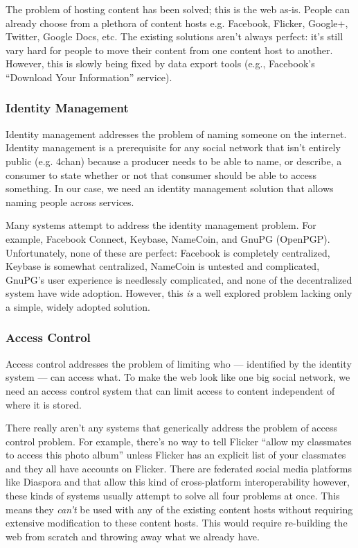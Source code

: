\documentclass[pdftex,12pt,a4papaer,twoside,notitlepage]{report}
\begin{document}
The problem of hosting content has been solved; this is the web as-is. People
can already choose from a plethora of content hosts e.g. Facebook, Flicker,
Google+, Twitter, Google Docs, etc. The existing solutions aren't always
perfect: it's still vary hard for people to move their content from one content
host to another. However, this is slowly being fixed by data export tools (e.g.,
Facebook's ``Download Your Information'' service).

\subsubsection{Identity Management}

Identity management addresses the problem of naming someone on the internet.
Identity management is a prerequisite for any social network that isn't entirely
public (e.g. 4chan) because a producer needs to be able to name, or describe, a
consumer to state whether or not that consumer should be able to access
something. In our case, we need an identity management solution that allows
naming people across services.

Many systems attempt to address the identity management problem. For example,
Facebook Connect, Keybase, NameCoin, and GnuPG (OpenPGP). Unfortunately, none of
these are perfect: Facebook is completely centralized, Keybase is somewhat
centralized, NameCoin is untested and complicated, GnuPG's user experience is
needlessly complicated, and none of the decentralized system have wide adoption.
However, this \emph{is} a well explored problem lacking only a simple, widely
adopted solution.

\subsubsection{Access Control}

Access control addresses the problem of limiting who --- identified by the
identity system --- can access what. To make the web look like one big social
network, we need an access control system that can limit access to content
independent of where it is stored.

There really aren't any systems that generically address the problem of access
control problem. For example, there's no way to tell Flicker ``allow my
classmates to access this photo album'' unless Flicker has an explicit list of
your classmates and they all have accounts on Flicker. There are federated
social media platforms like Diaspora and that allow this kind of cross-platform
interoperability however, these kinds of systems usually attempt to solve all
four problems at once. This means they \emph{can't} be used with any of the
existing content hosts without requiring extensive modification to these content
hosts. This would require re-building the web from scratch and throwing away
what we already have.
\end{document}

